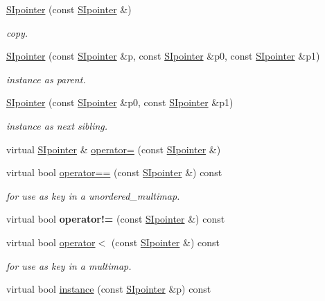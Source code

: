 \begin{DoxyCompactItemize}
\mbox{\hyperlink{group__table_ga3df3168789d247e497f127caa7840e88}{S\+Ipointer}} (const \mbox{\hyperlink{classSIpointer}{S\+Ipointer}} \&)
\begin{DoxyCompactList}\small\item\em copy. \end{DoxyCompactList}\item 
\mbox{\hyperlink{group__table_ga175406f6e30433d90a004aa27c401f29}{S\+Ipointer}} (const \mbox{\hyperlink{classSIpointer}{S\+Ipointer}} \&p, const \mbox{\hyperlink{classSIpointer}{S\+Ipointer}} \&p0, const \mbox{\hyperlink{classSIpointer}{S\+Ipointer}} \&p1)
\begin{DoxyCompactList}\small\item\em instance as parent. \end{DoxyCompactList}\item 
\mbox{\hyperlink{group__table_ga19a6965aca9363f90f45c5d0e07bc99e}{S\+Ipointer}} (const \mbox{\hyperlink{classSIpointer}{S\+Ipointer}} \&p0, const \mbox{\hyperlink{classSIpointer}{S\+Ipointer}} \&p1)
\begin{DoxyCompactList}\small\item\em instance as next sibling. \end{DoxyCompactList}\item 
virtual \mbox{\hyperlink{classSIpointer}{S\+Ipointer}} \& \mbox{\hyperlink{group__table_ga071bb69977a62e26f9ec11230ae2646b}{operator=}} (const \mbox{\hyperlink{classSIpointer}{S\+Ipointer}} \&)
\item 
virtual bool \mbox{\hyperlink{group__table_ga3330f8e59b08797b4c73ae558f6d588e}{operator==}} (const \mbox{\hyperlink{classSIpointer}{S\+Ipointer}} \&) const
\begin{DoxyCompactList}\small\item\em for use as key in a unordered\+\_\+multimap. \end{DoxyCompactList}\item 
virtual bool {\bfseries operator!=} (const \mbox{\hyperlink{classSIpointer}{S\+Ipointer}} \&) const
\item 
virtual bool \mbox{\hyperlink{group__table_ga51c64ecf271622a259840f55236778ef}{operator$<$}} (const \mbox{\hyperlink{classSIpointer}{S\+Ipointer}} \&) const
\begin{DoxyCompactList}\small\item\em for use as key in a multimap. \end{DoxyCompactList}\item 
virtual bool \mbox{\hyperlink{group__table_ga259b23462f7e87f6df0e9361c1884618}{instance}} (const \mbox{\hyperlink{classSIpointer}{S\+Ipointer}} \&p) const

\end{DoxyCompactItemize}
